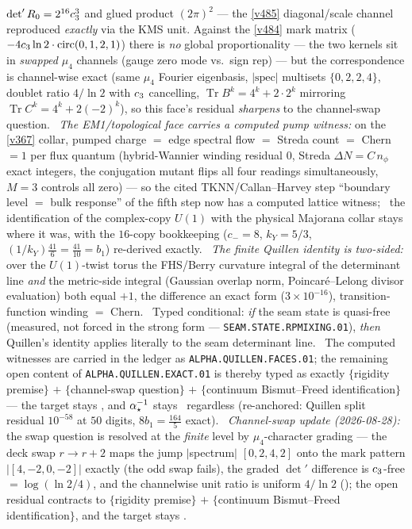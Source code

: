 $\det\nolimits'R_0=2^{16}c_3^3$ and glued product $(2\pi)^2$ --- the \vref{v485} diagonal/scale
channel reproduced \emph{exactly} via the KMS unit. Against the \vref{v484} mark matrix
($-4c_3\ln2\cdot\mathrm{circ}(0,1,2,1)$) there is \emph{no} global proportionality --- the two
kernels sit in \emph{swapped} $\mu_4$ channels (gauge zero mode vs.\ sign rep) --- but the
correspondence is channel-wise exact (same $\mu_4$ Fourier eigenbasis, $|\mathrm{spec}|$ multisets
$\{0,2,2,4\}$, doublet ratio $4/\ln2$ with $c_3$ cancelling,
$\operatorname{Tr}B^k=4^k+2\cdot2^k$ mirroring $\operatorname{Tr}C^k=4^k+2(-2)^k$), so this face's
residual \emph{sharpens} to the channel-swap question. \mE\ \emph{The EM1/topological face carries a
computed pump witness:} on the \vref{v367} collar, pumped charge $=$ edge spectral flow $=$ Streda
count $=$ Chern $=1$ per flux quantum (hybrid-Wannier winding residual $0$, Streda
$\Delta N=C\,n_\phi$ exact integers, the conjugation mutant flips all four readings simultaneously,
$M{=}3$ controls all zero) --- so the cited TKNN/Callan--Harvey step ``boundary level $=$ bulk
response'' of the fifth step now has a computed lattice witness; \mC\ the identification of the
complex-copy $U(1)$ with the physical Majorana collar stays where it was, with the $16$-copy
bookkeeping ($c_-{=}8$, $k_Y{=}5/3$, $(1/k_Y)\tfrac{41}6=\tfrac{41}{10}=b_1$) re-derived exactly.
\mE\ \emph{The finite Quillen identity is two-sided:} over the $U(1)$-twist torus the FHS/Berry
curvature integral of the determinant line \emph{and} the metric-side integral (Gaussian overlap norm,
Poincar\'e--Lelong divisor evaluation) both equal $+1$, the difference an exact form
($3\times10^{-16}$), transition-function winding $=$ Chern. \mC\ Typed conditional: \emph{if} the seam
state is quasi-free (measured, not forced in the strong form --- \texttt{SEAM.STATE.RPMIXING.01}),
\emph{then} Quillen's identity applies literally to the seam determinant line. \mE\ The computed
witnesses are carried in the ledger as \texttt{ALPHA.QUILLEN.FACES.01}; the remaining open content of
\texttt{ALPHA.QUILLEN.EXACT.01} is thereby typed as exactly $\{$rigidity premise$\}$ $+$
$\{$channel-swap question$\}$ $+$ $\{$continuum Bismut--Freed identification$\}$ --- the target stays
\mO, and $\alpha^{-1}_\star$ stays \mE\ regardless (re-anchored: Quillen split residual $10^{-58}$ at $50$ digits,
$8b_1=\tfrac{164}5$ exact). \mE\ \emph{Channel-swap update (2026-08-28):} the swap question is
resolved at the \emph{finite} level by $\mu_4$-character grading --- the deck swap $r\to r{+}2$
maps the jump $|$spectrum$|$ $[0,2,4,2]$ onto the mark pattern $|[4,-2,0,-2]|$ exactly (the odd
swap fails), the graded $\det'$ difference is $c_3$-free $=\log(\ln2/4)$, and the channelwise
unit ratio is uniform $4/\ln2$ (); the open residual
contracts to $\{$rigidity premise$\}$ $+$ $\{$continuum Bismut--Freed identification$\}$, and the
target stays \mO.
\par\smallskip

